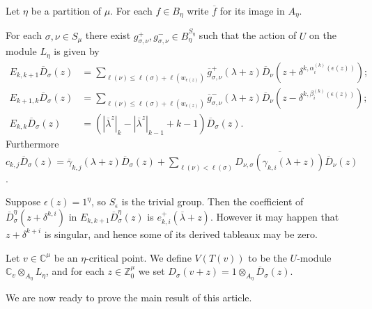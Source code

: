 \documentclass[11pt,fleqn]{article}
\newcommand\CC{\mathbb C}
\newcommand\ZZ{\mathbb Z}
\newcommand\D{\overline D}
\newcommand\ot{\otimes}
\begin{document}
\begin{Proposition}
\label{P:generic-eta-module}
Let $\eta$ be a partition of $\mu$. For each $f \in B_\eta$ write $\overline 
f$ for its image in $A_\eta$.

For each $\sigma, \nu \in S_\mu$ there exist $g^+_{\sigma,\nu}, 
g^-_{\sigma,\nu} \in B_\eta^{S_\eta}$ such that the action of $U$ on the 
module $L_\eta$ is given by
\begin{align*}
  E_{k,k+1} \D_\sigma(z) 
    &= \sum_{\ell(\nu) \leq \ell(\sigma) + \ell(w_{\epsilon(z)})}  
    \overline g^+_{\sigma, \nu}(\lambda + z)
      \D_\nu(z + \delta^{k,\alpha_i^{(k)}(\epsilon(z))});\\
  E_{k+1,k} \D_\sigma(z) 
    &= \sum_{\ell(\nu) \leq \ell(\sigma) + \ell(w_{\epsilon(z)})} 
      \overline g^-_{\sigma, \nu}(\lambda + z) \D_\nu(z-\delta^{k,
        \beta_i^{(k)}(\epsilon(z))});\\
  E_{k,k} \D_\sigma(z) 
    &= (|\overline \lambda^z|_k - |\overline \lambda^z|_{k-1} + k -1) 
      \D_\sigma(z).
\end{align*} 
Furthermore $c_{k,j} \D_\sigma(z) = \overline \gamma_{k,j}(\lambda + z) 
\D_\sigma(z) + \sum_{\ell (\nu) < \ell(\sigma)} \overline{D_{\nu, \sigma}
(\gamma_{k,i}(\lambda + z))} \D_\nu(z)$.
\end{Proposition}
\begin{Remark}
Suppose $\epsilon(z) = 1^\eta$, so $S_\epsilon$ is the trivial group. Then the 
coefficient of $\overline D_{\sigma}^\eta(z+\delta^{k,i})$ in $E_{k,k+1} 
\overline D_{\sigma}^\eta(z)$ is $e_{k,i}^+(\overline \lambda + z)$. However
it may happen that $z + \delta^{k+i}$ is singular, and hence some of its 
derived tableaux may be zero.
\end{Remark}

\begin{Definition}
Let $v \in \CC^\mu$ be an $\eta$-critical point. We define $V(T(v))$ to be the
$U$-module $\CC_v \ot_{A_\eta} L_\eta$, and for each $z \in \ZZ^\mu_0$ we set 
$D_\sigma(v+z) = 1 \ot_{A_\eta} \D_\sigma(z)$.
\end{Definition}
We are now ready to prove the main result of this article.
\end{document}
